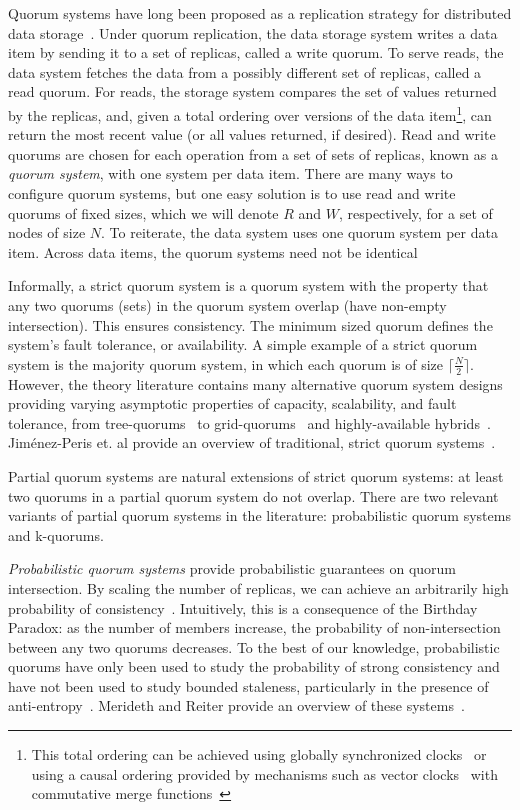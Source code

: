\documentclass{vldb}
\begin{document}
Quorum systems have long been proposed as a replication strategy for
distributed data storage~\cite{quorums-start}.  Under quorum
replication, the data storage system writes a data item by sending it
to a set of replicas, called a write quorum.  To serve reads, the data
system fetches the data from a possibly different set of replicas,
called a read quorum.  For reads, the storage system compares the set
of values returned by the replicas, and, given a total ordering over
versions of the data item\footnote{This total ordering can be achieved
  using globally synchronized clocks~\cite{synch-clocks} or using a
  causal ordering provided by mechanisms such as vector
  clocks~\cite{vectorclock} with commutative merge
  functions~\cite{cops}}, can return the most recent value (or all
values returned, if desired).  Read and write quorums are chosen for
each operation from a set of sets of replicas, known as a
\textit{quorum system}, with one system per data item.  There are many
ways to configure quorum systems, but one easy solution is to use read
and write quorums of fixed sizes, which we will denote $R$ and $W$,
respectively, for a set of nodes of size $N$.  To reiterate, the data
system uses one quorum system per data item.  Across data items, the
quorum systems need not be identical

Informally, a strict quorum system is a quorum system with the
property that any two quorums (sets) in the quorum system overlap
(have non-empty intersection). This ensures consistency.  The minimum
sized quorum defines the system's fault tolerance, or availability.  A
simple example of a strict quorum system is the majority quorum
system, in which each quorum is of size $\lceil \frac{N}{2}\rceil$.
However, the theory literature contains many alternative quorum system
designs providing varying asymptotic properties of capacity,
scalability, and fault tolerance, from tree-quorums~\cite{treequorum}
to grid-quorums~\cite{quorumsystems} and highly-available
hybrids~\cite{92-quorums}.  Jim\'{e}nez-Peris et. al provide an
overview of traditional, strict quorum
systems~\cite{quorums-alternative}.

Partial quorum systems are natural extensions of strict quorum
systems: at least two quorums in a partial quorum system do not
overlap.  There are two relevant variants of partial quorum systems in
the literature: probabilistic quorum systems and k-quorums.

\textit{Probabilistic quorum systems} provide probabilistic guarantees
on quorum intersection.  By scaling the number of replicas, we can
achieve an arbitrarily high probability of
consistency~\cite{prob-quorum}.  Intuitively, this is a consequence of
the Birthday Paradox: as the number of members increase, the
probability of non-intersection between any two quorums decreases.  To
the best of our knowledge, probabilistic quorums have only been used
to study the probability of strong consistency and have not been used
to study bounded staleness, particularly in the presence of
anti-entropy~\cite{antientropy}.  Merideth and Reiter provide an
overview of these systems~\cite{quorum-overview}.
\end{document}
